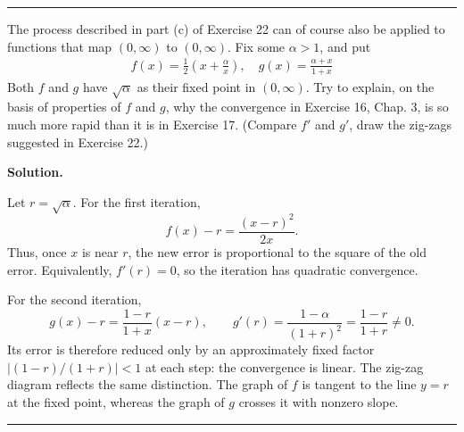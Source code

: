 \documentclass[12pt]{article}
\theoremstyle{definition}
\begin{document}
\bigskip\noindent\hrule\bigskip

The process described in part (c) of Exercise 22 can of course also be applied to functions that map $(0,\infty)$ to $(0,\infty)$.
Fix some $\alpha>1$, and put
\begin{align*}
f(x)=\frac{1}{2}\left(x+\frac{\alpha}{x}\right),\quad g(x)=\frac{\alpha+x}{1+x}
\end{align*}
Both $f$ and $g$ have $\sqrt{\alpha}$ as their fixed point in $(0,\infty)$. Try to explain, on the basis of properties of $f$ and $g$, why the convergence in Exercise 16, Chap. 3, is so much more rapid than it is in Exercise 17. (Compare $f'$ and $g'$, draw the zig-zags suggested in Exercise 22.)

\smallskip
\noindent\textbf{Solution.}\quad

Let $r=\sqrt{\alpha}$.  For the first iteration,
\[
 f(x)-r=\frac{(x-r)^2}{2x}.
\]
Thus, once $x$ is near $r$, the new error is proportional to the square of the old error.  Equivalently, $f'(r)=0$, so the iteration has quadratic convergence.

For the second iteration,
\[
 g(x)-r=\frac{1-r}{1+x}(x-r),
 \qquad
 g'(r)=\frac{1-\alpha}{(1+r)^2}=\frac{1-r}{1+r}\ne0.
\]
Its error is therefore reduced only by an approximately fixed factor $|(1-r)/(1+r)|<1$ at each step: the convergence is linear.  The zig-zag diagram reflects the same distinction.  The graph of $f$ is tangent to the line $y=r$ at the fixed point, whereas the graph of $g$ crosses it with nonzero slope.



\bigskip\noindent\hrule\bigskip
\end{document}
